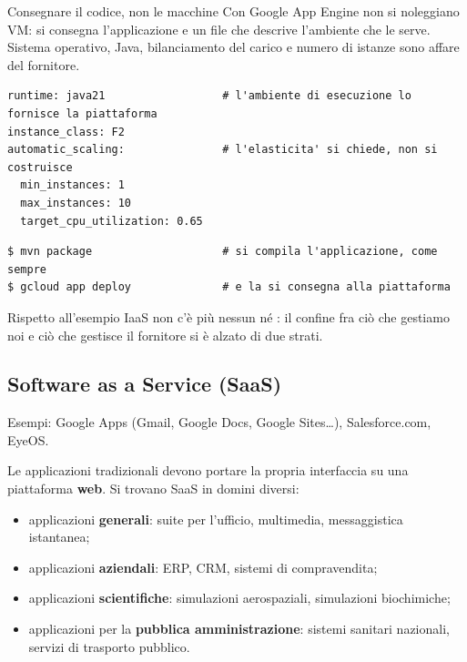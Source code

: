 \begin{esempio}{Consegnare il codice, non le macchine}
Con Google App Engine non si noleggiano VM: si consegna l'applicazione e un file che descrive l'ambiente che le serve.
Sistema operativo, Java, bilanciamento del carico e numero di istanze sono affare del fornitore.
\begin{lstlisting}[style=yaml, name=app.yaml]
runtime: java21                  # l'ambiente di esecuzione lo fornisce la piattaforma
instance_class: F2
automatic_scaling:               # l'elasticita' si chiede, non si costruisce
  min_instances: 1
  max_instances: 10
  target_cpu_utilization: 0.65
\end{lstlisting}
\begin{lstlisting}[style=shell, name=Terminale]
$ mvn package                    # si compila l'applicazione, come sempre
$ gcloud app deploy              # e la si consegna alla piattaforma
\end{lstlisting}
Rispetto all'esempio IaaS non c'è più nessun  né : il confine fra ciò che gestiamo noi e ciò
che gestisce il fornitore si è alzato di due strati.
\end{esempio}

\subsection{Software as a Service (SaaS)}

Esempi: Google Apps (Gmail, Google Docs, Google Sites\ldots), Salesforce.com, EyeOS.

Le applicazioni tradizionali devono portare la propria interfaccia su una piattaforma \textbf{web}. Si trovano SaaS in
domini diversi:
\begin{itemize}
  \item applicazioni \textbf{generali}: suite per l'ufficio, multimedia, messaggistica istantanea;
  \item applicazioni \textbf{aziendali}: ERP, CRM, sistemi di compravendita;
  \item applicazioni \textbf{scientifiche}: simulazioni aerospaziali, simulazioni biochimiche;
  \item applicazioni per la \textbf{pubblica amministrazione}: sistemi sanitari nazionali, servizi di trasporto pubblico.
\end{itemize}

